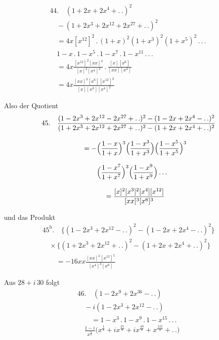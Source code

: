 \[
\begin{gathered}
44.\quad (1+2x+2x^4+ .\,.)^2\\[8pt]\quad{}-(1+2x^3+2x^{12}+2x^{27}+ .\,.)^2\\[8pt]
\quad=4x[x^{12}]^2\,.\,(1+x)^2(1+x^3)^2(1+x^5)^2\,.\,.\,.\,\\[8pt]\quad{}
1-x\,.\,1-x^5\,.\,1-x^7\,.\,1-x^{11}\,.\,.\,.\\[8pt]
\quad=4x\frac{[x^{12}]^2[xx]^4}{[x]^2[x^4]^2}\,.\,
\frac{[x][x^6]}{[xx][x^3]}
\\[8pt]\quad{}=4x\frac{[xx]^3[x^6][x^{12}]^2}{[x][x^3][x^4]^2}
\end{gathered}
\]

Also der Quotient
\[
\begin{gathered}
45.\quad \frac{(1-2x^3+2x^{12}-2x^{27}+ .\,.)^2-(1-2x+2x^4- .\,.)^2}
{(1+2x^3+2x^{12}+2x^{27}+ .\,.)^2-(1+2x+2x^4+ .\,.)^2}\\[8pt]
\qquad=-\Bigl(\frac{1-x}{1+x}\Bigr)^3
\Bigl(\frac{1-x^3}{1+x^3}\Bigr)
\Bigl(\frac{1-x^5}{1+x^5}\Bigr)^3
\\[8pt]\quad{}\Bigl(\frac{1-x^7}{1+x^7}\Bigr)^3
\Bigl(\frac{1-x^9}{1+x^9}\Bigr)\,.\,.\,.\\[8pt]
\qquad=\frac{[x]^2[x^3]^2[x^4][x^{12}]}{[xx]^3[x^6]^3}
\end{gathered}
\]

und das Produkt
\[
\begin{gathered}
45^{\mathrm b}.\quad \bigl\{(1-2x^3+2x^{12}- .\,.)^2-(1-2x+2x^4- .\,.)^2\bigr\}\\[8pt]
\quad\times\bigl\{(1+2x^3+2x^{12}+ .\,.)^2-(1+2x+2x^4+ .\,.)^2\bigr\}\\[8pt]
\qquad=-16xx\frac{[xx]^3[x^{12}]^5}{[x^4]^3[x^6]}
\end{gathered}
\]

Aus $28+i\,30$ folgt
\[
\begin{gathered}
46.\quad (1-2x^9+2x^{36}- .\,.)\\[8pt]\quad{}-i(1-2x^3+2x^{12}- .\,.)\\[8pt]
\qquad=1-x^3\,.\,1-x^9\,.\,1-x^{15}\,.\,.\,.\,
\\[8pt]\quad{}\frac{1-i}{x^{\frac18}}\bigl(x^{\frac18}+ix^{\frac{25}{8}}+ix^{\frac{49}{8}}+x^{\frac{121}{8}}+ .\,.\bigr)
\end{gathered}
\]

